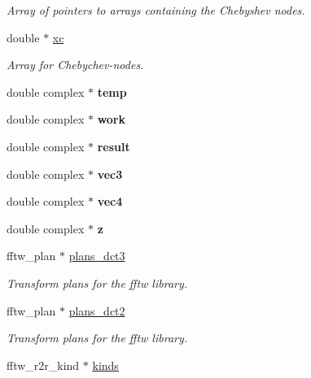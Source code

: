 \begin{CompactItemize}
\begin{CompactList}\small\item\em Array of pointers to arrays containing the Chebyshev nodes. \item\end{CompactList}\item 
\hypertarget{structfpt__set__s___o6}{
double $\ast$ \hyperlink{structfpt__set__s___o6}{xc}}
\label{structfpt__set__s___o6}

\begin{CompactList}\small\item\em Array for Chebychev-nodes. \item\end{CompactList}\item 
\hypertarget{structfpt__set__s___o7}{
double complex $\ast$ {\bf temp}}
\label{structfpt__set__s___o7}

\item 
\hypertarget{structfpt__set__s___o8}{
double complex $\ast$ {\bf work}}
\label{structfpt__set__s___o8}

\item 
\hypertarget{structfpt__set__s___o9}{
double complex $\ast$ {\bf result}}
\label{structfpt__set__s___o9}

\item 
\hypertarget{structfpt__set__s___o10}{
double complex $\ast$ {\bf vec3}}
\label{structfpt__set__s___o10}

\item 
\hypertarget{structfpt__set__s___o11}{
double complex $\ast$ {\bf vec4}}
\label{structfpt__set__s___o11}

\item 
\hypertarget{structfpt__set__s___o12}{
double complex $\ast$ {\bf z}}
\label{structfpt__set__s___o12}

\item 
\hypertarget{structfpt__set__s___o13}{
fftw\_\-plan $\ast$ \hyperlink{structfpt__set__s___o13}{plans\_\-dct3}}
\label{structfpt__set__s___o13}

\begin{CompactList}\small\item\em Transform plans for the fftw library. \item\end{CompactList}\item 
\hypertarget{structfpt__set__s___o14}{
fftw\_\-plan $\ast$ \hyperlink{structfpt__set__s___o14}{plans\_\-dct2}}
\label{structfpt__set__s___o14}

\begin{CompactList}\small\item\em Transform plans for the fftw library. \item\end{CompactList}\item 
\hypertarget{structfpt__set__s___o15}{
fftw\_\-r2r\_\-kind $\ast$ \hyperlink{structfpt__set__s___o15}{kinds}}
\label{structfpt__set__s___o15}


\end{CompactItemize}
